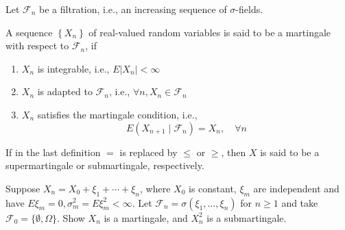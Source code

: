 Let $\mathcal{F}_{n}$ be a filtration, i.e., an increasing sequence of $\sigma$-fields.
\begin{definition}[Martingale]
    A sequence $\left\{X_{n}\right\}$ of real-valued random variables  is said to be a martingale with respect to $\mathcal{F}_{n}$, if
    \begin{enumerate}
        \item $X_{n}$ is integrable, i.e., $E\left|X_{n}\right|<\infty$
        \item $X_{n}$ is adapted to $\mathcal{F}_{n}$, i.e., $\forall n,X_{n}\in \mathcal{F}_{n}$
        \item $X_{n}$ satisfies the martingale condition, i.e.,
              \begin{equation}
                  E\left(X_{n+1}\mid\mathcal{F}_{n}\right)=X_{n},\quad\forall n
              \end{equation}
    \end{enumerate}
\end{definition}

\begin{note}
    If in the last definition $=$ is replaced by $\leq$ or $\geq$, then $X$ is said to be a supermartingale or submartingale, respectively.
\end{note}

\begin{example}

\end{example}

\begin{example}

\end{example}

\begin{example}
    
\end{example}

\begin{example}
    Suppose $X_{n}=X_{0}+\xi_{1}+\cdots+\xi_{n}$, where $X_{0}$ is constant, $\xi_{m}$ are independent and have $E\xi_{m}=0,\sigma_{m}^{2}=E\xi_{m}^{2}<\infty$. Let $\mathcal{F}_{n}=\sigma\left(\xi_{1},\ldots,\xi_{n}\right)$ for $n\geq 1$ and take $\mathcal{F}_{0}=\{\emptyset, \Omega\}$. Show $X_{n}$ is a martingale, and $X_{n}^{2}$ is a submartingale.
\end{example}

